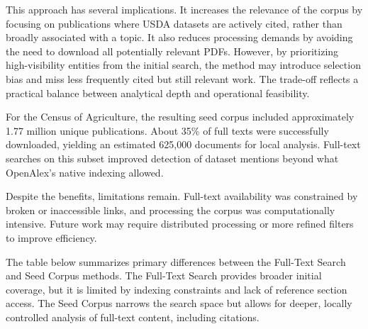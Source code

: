 \documentclass[
  letterpaper,
  DIV=11,
  numbers=noendperiod]{scrartcl}
\begin{document}
This approach has several implications. It increases the relevance of
the corpus by focusing on publications where USDA datasets are actively
cited, rather than broadly associated with a topic. It also reduces
processing demands by avoiding the need to download all potentially
relevant PDFs. However, by prioritizing high-visibility entities from
the initial search, the method may introduce selection bias and miss
less frequently cited but still relevant work. The trade-off reflects a
practical balance between analytical depth and operational feasibility.

For the Census of Agriculture, the resulting seed corpus included
approximately 1.77 million unique publications. About 35\% of full texts
were successfully downloaded, yielding an estimated 625,000 documents
for local analysis. Full-text searches on this subset improved detection
of dataset mentions beyond what OpenAlex's native indexing allowed.

Despite the benefits, limitations remain. Full-text availability was
constrained by broken or inaccessible links, and processing the corpus
was computationally intensive. Future work may require distributed
processing or more refined filters to improve efficiency.

The table below summarizes primary differences between the Full-Text
Search and Seed Corpus methods. The Full-Text Search provides broader
initial coverage, but it is limited by indexing constraints and lack of
reference section access. The Seed Corpus narrows the search space but
allows for deeper, locally controlled analysis of full-text content,
including citations.
\end{document}
